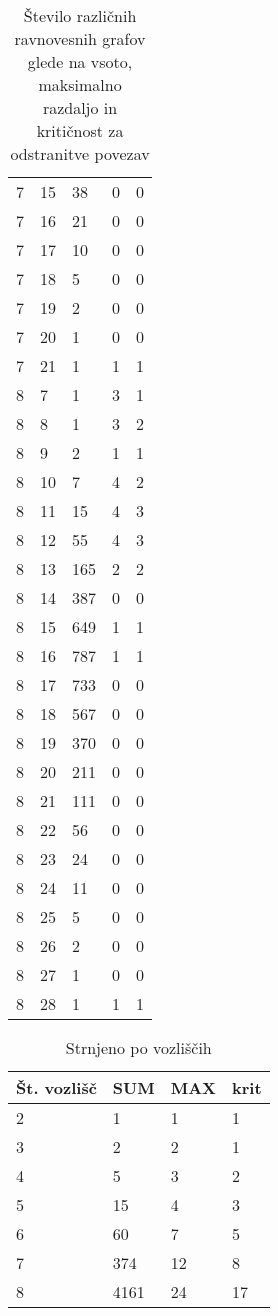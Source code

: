 \documentclass[fin1, tisk]{fmfdelo}
\begin{document}
\begin{table}[h]
\begin{tabular}{lllll}
        7 & 15 & 38 & 0 & 0 \\ 
        7 & 16 & 21 & 0 & 0 \\ 
        7 & 17 & 10 & 0 & 0 \\ 
        7 & 18 & 5 & 0 & 0 \\ 
        7 & 19 & 2 & 0 & 0 \\ 
        7 & 20 & 1 & 0 & 0 \\ 
        7 & 21 & 1 & 1 & 1 \\ 
        8 & 7 & 1 & 3 & 1 \\ 
        8 & 8 & 1 & 3 & 2 \\ 
        8 & 9 & 2 & 1 & 1 \\ 
        8 & 10 & 7 & 4 & 2 \\ 
        8 & 11 & 15 & 4 & 3 \\ 
        8 & 12 & 55 & 4 & 3 \\ 
        8 & 13 & 165 & 2 & 2 \\ 
        8 & 14 & 387 & 0 & 0 \\ 
        8 & 15 & 649 & 1 & 1 \\ 
        8 & 16 & 787 & 1 & 1 \\ 
        8 & 17 & 733 & 0 & 0 \\ 
        8 & 18 & 567 & 0 & 0 \\ 
        8 & 19 & 370 & 0 & 0 \\ 
        8 & 20 & 211 & 0 & 0 \\ 
        8 & 21 & 111 & 0 & 0 \\ 
        8 & 22 & 56 & 0 & 0 \\ 
        8 & 23 & 24 & 0 & 0 \\ 
        8 & 24 & 11 & 0 & 0 \\ 
        8 & 25 & 5 & 0 & 0 \\ 
        8 & 26 & 2 & 0 & 0 \\ 
        8 & 27 & 1 & 0 & 0 \\ 
        8 & 28 & 1 & 1 & 1 \\ 
    \end{tabular}
    \caption{Število različnih ravnovesnih grafov glede na vsoto, maksimalno razdaljo in kritičnost za odstranitve povezav}
\end{table}

\begin{table}[h]
    \centering
    \begin{tabular}{llll}
        Št. vozlišč & SUM  & MAX & krit\\
        \hline
        2           & 1    & 1   & 1   \\
        3           & 2    & 2   & 1   \\
        4           & 5    & 3   & 2   \\
        5           & 15   & 4   & 3   \\
        6           & 60   & 7   & 5   \\
        7           & 374  & 12  & 8   \\
        8           & 4161 & 24  & 17 
    \end{tabular}
    \caption{Strnjeno po vozliščih}
\end{table}
\end{document}
